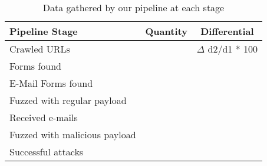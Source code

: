 \begin{wraptable}{r}{7cm}
	\centering
	\scriptsize
	\begin{tabular}{|l|c|c|}
		\hline
		\textbf{Pipeline Stage} & \textbf{Quantity} & \textbf{Differential}\\
		\hline
		Crawled URLs  & \urls & $\Delta$ d2/d1 * 100 \\
		\hline
		Forms found  & \forms & \formsDelta \\
		\hline
		E-Mail Forms found  & \emailforms & \emailformsDelta \\
		\hline
		Fuzzed with regular payload  & \fuzzed & \fuzzedDelta \\
		\hline
		Received e-mails  & \recd & \recdDelta \\
		\hline
		Fuzzed with malicious payload  & \malfuzzed & \malfuzzedDelta \\
		\hline
		Successful attacks  & \success & \successDelta \\
		\hline

	\end{tabular}
	\caption[]{Data gathered
      by our pipeline at each stage}
    \vspace{-5ex}
	\label{tab:pipeline}
\end{wraptable}
